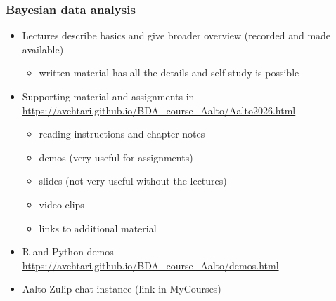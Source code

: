 \documentclass[english,t]{beamer}
\begin{document}
\begin{frame}
  \frametitle{Bayesian data analysis}  %

  \begin{itemize}
  \item Lectures describe basics and give broader overview (recorded
    and made available)
    \begin{itemize}
    \item written material has all the details and self-study
      is possible
    \end{itemize}
  \item Supporting material and assignments in
    {\small\url{https://avehtari.github.io/BDA_course_Aalto/Aalto2026.html}}
    \begin{itemize}
    \item reading instructions and chapter notes
    \item demos (very useful for assignments)
    \item slides (not very useful without the lectures)
    \item video clips
    \item links to additional material
    \end{itemize}
   \item R and Python demos {\small\url{https://avehtari.github.io/BDA_course_Aalto/demos.html}}
  \item Aalto Zulip chat instance (link in MyCourses)
  \end{itemize}

\end{frame}
\end{document}
